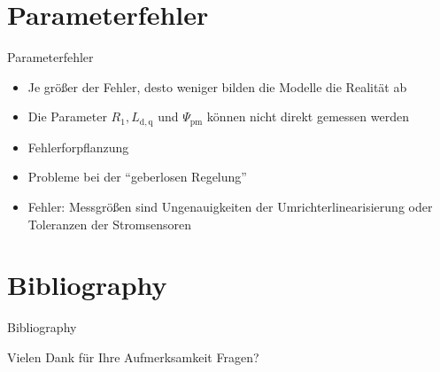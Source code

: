 \documentclass{beamer}
\newcommand{\x}[1]{\mathrm{#1}}
\begin{document}
\section{Parameterfehler}
\begin{frame}{Parameterfehler}
\begin{itemize}
	\item Je größer der Fehler, desto weniger bilden die Modelle die Realität ab
	\item Die Parameter $R_\x{1}, L_\x{d,q}$ und $\Psi_\x{pm}$ können nicht direkt gemessen werden
	\item Fehlerforpflanzung
	\item Probleme bei der \enquote{geberlosen Regelung}
	\item Fehler: Messgrößen sind Ungenauigkeiten der Umrichterlinearisierung oder Toleranzen der Stromsensoren
\end{itemize}
\end{frame}

\section*{Bibliography}
\begin{frame}[allowframebreaks]{Bibliography}
\nocite{ternesfeldkamp}
\nocite{Bruhn2009}
\nocite{Perassi2006}
\nocite{genduso}
\nocite{fischer2009}
\printbibliography
\end{frame}

\begin{frame}[plain]{Vielen Dank für Ihre Aufmerksamkeit}	
	\huge{Fragen?}		
\end{frame}

\end{document}
